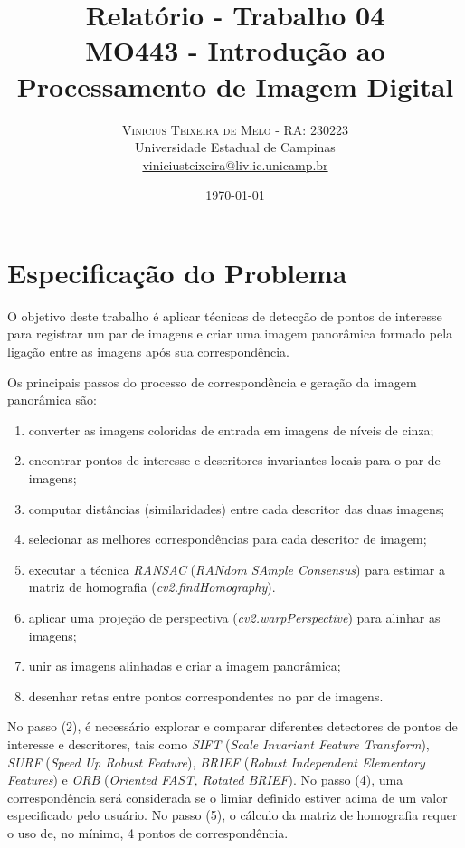 \documentclass[twoside,twocolumn]{article}
\title{Relatório - Trabalho 04 \\ \Large MO443 - Introdução ao Processamento de Imagem Digital} %
\author{%
\textsc{Vinicius Teixeira de Melo - RA: 230223} \\[1ex] %
\normalsize Universidade Estadual de Campinas \\ %
\normalsize \href{mailto:viniciusteixeira@liv.ic.unicamp.br}{viniciusteixeira@liv.ic.unicamp.br} %
}
\date{\today} %
\begin{document}
\maketitle


\section{Especificação do Problema}

O objetivo deste trabalho é aplicar técnicas de detecção de pontos de interesse para registrar um par de imagens e criar uma imagem panorâmica formado pela ligação entre as imagens após sua correspondência.

Os principais passos do processo de correspondência e geração da imagem panorâmica são:

\begin{enumerate}
	\item converter as imagens coloridas de entrada em imagens de níveis de cinza;
	\item encontrar pontos de interesse e descritores invariantes locais para o par de imagens;
	\item computar distâncias (similaridades) entre cada descritor das duas imagens;
	\item selecionar as melhores correspondências para cada descritor de imagem;
	\item executar a técnica \textit{RANSAC} (\textit{RANdom SAmple Consensus}) para estimar a matriz de homografia (\textit{cv2.findHomography}).
	\item aplicar uma projeção de perspectiva (\textit{cv2.warpPerspective}) para alinhar as imagens;
	\item unir as imagens alinhadas e criar a imagem panorâmica;
	\item desenhar retas entre pontos correspondentes no par de imagens.
\end{enumerate}

No passo (2), é necessário explorar e comparar diferentes detectores de pontos de interesse e descritores, tais como \textit{SIFT} (\textit{Scale Invariant Feature Transform}), \textit{SURF} (\textit{Speed Up Robust Feature}), \textit{BRIEF} (\textit{Robust Independent Elementary Features}) e \textit{ORB} (\textit{Oriented FAST, Rotated BRIEF}). No passo (4), uma correspondência será considerada se o limiar definido estiver acima de um valor especificado pelo usuário. No passo (5), o cálculo da matriz de homografia requer o uso de, no mínimo, 4 pontos de correspondência.
\end{document}
